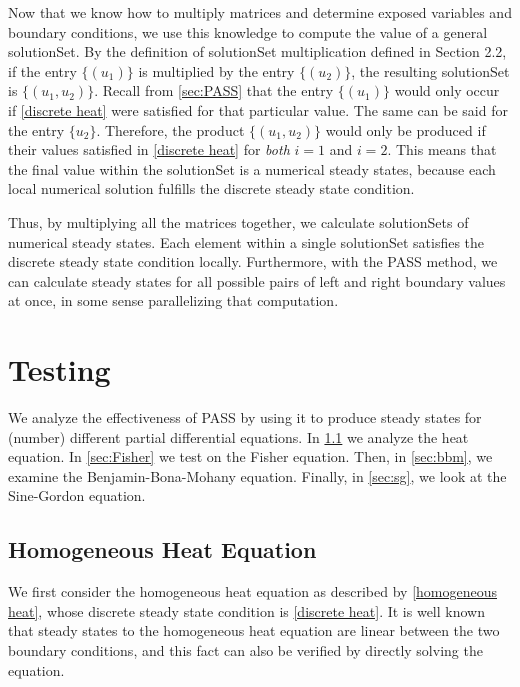 \documentclass[11pt]{article}
\begin{document}
Now that we know how to multiply matrices and determine exposed variables and boundary conditions, we use this knowledge to compute the value of a general solutionSet.  By the definition of solutionSet multiplication defined in Section 2.2, if the entry $\{(u_1)\}$ is multiplied by the entry $\{(u_2)\}$, the resulting solutionSet is $\{(u_1, u_2)\}$. Recall from \cref{sec:PASS} that the entry $\{(u_1)\}$ would only occur if \cref{discrete heat} were satisfied for that particular value. The same can be said for the entry $\{u_2\}$. Therefore, the product $\{(u_1, u_2)\}$ would only be produced if their values satisfied in \cref{discrete heat} for \textit{both} $i = 1$ and $i = 2$. This means that the final value within the solutionSet is a numerical steady states, because each local numerical solution fulfills the discrete steady state condition.

Thus, by multiplying all the matrices together, we calculate solutionSets of numerical steady states. Each element within a single solutionSet satisfies the discrete steady state condition locally. Furthermore, with the PASS method, we can calculate steady states for all possible pairs of left and right boundary values at once, in some sense parallelizing that computation.

\section{Testing}\label{sec:testing}

We analyze the effectiveness of PASS by using it to produce steady states for (number) different partial differential equations. In \cref{sec:homog_heat} we analyze the heat equation. In \cref{sec:Fisher} we test on the Fisher equation. Then, in \cref{sec:bbm}, we examine the Benjamin-Bona-Mohany equation. Finally, in \cref{sec:sg}, we look at the Sine-Gordon equation.

\subsection{Homogeneous Heat Equation}\label{sec:homog_heat}

We first consider the homogeneous heat equation as described by \cref{homogeneous heat}, whose discrete steady state condition is \cref{discrete heat}. It is well known that steady states to the homogeneous heat equation are linear between the two boundary conditions, and this fact can also be verified by directly solving the equation. 
\end{document}
